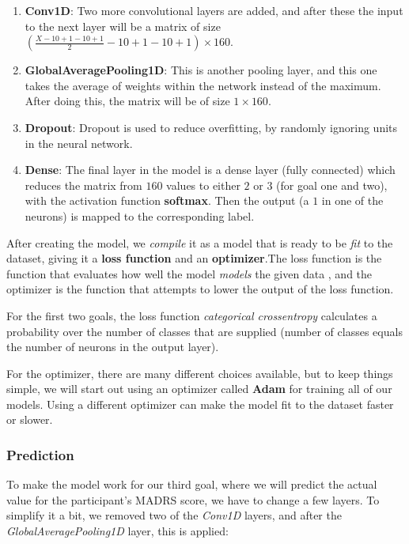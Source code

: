 \begin{enumerate}
  \item \textbf{Conv1D}: Two more convolutional layers are added, and after these the input to the next layer will be a matrix of size
        $ \left( \frac{X-10+1-10+1}{2}-10+1-10+1 \right) \times 160 $.
  \item \textbf{GlobalAveragePooling1D}: This is another pooling layer, and this one takes the average of weights within the network instead of the maximum.
        After doing this, the matrix will be of size $ 1 \times 160 $.
  \item \textbf{Dropout}: Dropout is used to reduce overfitting, by randomly ignoring units in the neural network. 
  \item \textbf{Dense}: The final layer in the model is a dense layer (fully connected) which reduces the matrix from $160$ values to 
        either $2$ or $3$ (for goal one and two), with the activation function \textbf{softmax}. 
        Then the output (a $1$ in one of the neurons) is mapped to the corresponding label.
        
\end{enumerate}

After creating the model, we \textit{compile} it as a model that is ready to be \textit{fit} to the dataset, 
giving it a \textbf{loss function} and an \textbf{optimizer}.The loss function is the function that evaluates how well the 
model \textit{models} the given data \cite{loss_functions}, and the optimizer is the function that attempts to lower the output of the loss function. 

For the first two goals, the loss function \textit{categorical crossentropy} calculates a probability over the 
number of classes that are supplied (number of classes equals the number of neurons in the output layer). 

For the optimizer, there are many different choices available,
but to keep things simple, we will start out using an optimizer called \textbf{Adam} for training all of our models. Using a different optimizer can make the 
model fit to the dataset faster or slower. 

\subsubsection{Prediction}
To make the model work for our third goal, where we will predict the actual value for the participant's MADRS score, we have to change a few layers.
To simplify it a bit, we removed two of the \textit{Conv1D} layers, and after the \textit{GlobalAveragePooling1D} layer, this is applied:

